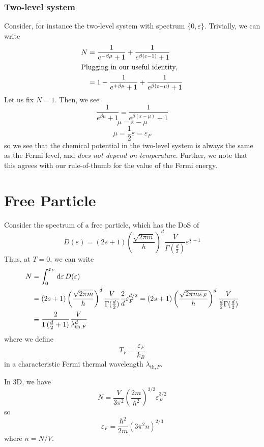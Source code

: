 \subsubsection{Two-level system}
Consider, for instance the two-level system with spectrum \(\{0,\varepsilon\}\). Trivially, we can write
\begin{align*}
	N &= \frac{1}{e^{-\beta\mu}+1}+\frac{1}{e^{\beta(\varepsilon-1)}+1}\\
	\intertext{Plugging in our useful identity,}
	  &=1 - \frac{1}{e^{+\beta\mu}+1}+\frac{1}{e^{\beta(\varepsilon-\mu)}+1}
\end{align*}
Let us fix \(N=1\). Then, we see
\[\frac{1}{e^{\beta\mu}+1} = \frac{1}{e^{\beta(\varepsilon-\mu)}+1}\]
\[\mu=\varepsilon-\mu\]
\[\mu = \frac{1}{2}\varepsilon = \varepsilon_F\]
so we see that the chemical potential in the two-level system is always the same as the Fermi level, and \emph{does not depend on temperature}. Further, we note that this agrees with our rule-of-thumb for the value of the Fermi energy.

\section{Free Particle}
Consider the spectrum of a free particle, which has the DoS of
\[D(\varepsilon) = (2s+1)\left(\frac{\sqrt{2\pi m}}{h}\right)^d\frac{V}{\Gamma\left(\frac{d}{2}\right)}\varepsilon^{\frac{d}{2}-1}\]
Thus, at \(T=0\), we can write
\begin{subequations}
\begin{align}
	N&=\int_0^{\varepsilon_F}\d{\varepsilon} D(\varepsilon)\\
	 &=(2s+1)\left(\frac{\sqrt{2\pi m}}{h}\right)^d\frac{V}{\Gamma(\frac{d}{2})} \frac{2}{d}\varepsilon_F^{d/2}=(2s+1)\left(\frac{\sqrt{2\pi m\varepsilon_F}}{h}\right)^d\frac{V}{\frac{d}{2}\Gamma(\frac{d}{2})} \nonumber\\
	 &\equiv \frac{2}{\Gamma(\frac{d}{2}+1)}\frac{V}{\lambda^d_{\text{th},F}}
\end{align}
\end{subequations}
where we define 
\begin{equation}
	T_F = \frac{\varepsilon_F}{k_B}
\end{equation}
in a characteristic Fermi thermal wavelength \(\lambda_{\text{th},F}\).

In 3D, we have 
\[N = \frac{V}{3\pi^2}\left(\frac{2m}{\hbar^2}\right)^{3/2}\varepsilon_F^{3/2}\]
so
\[\varepsilon_F = \frac{\hbar^2}{2m}\left(3\pi^2 n\right)^{2/3}\]
where \(n=N/V\).

